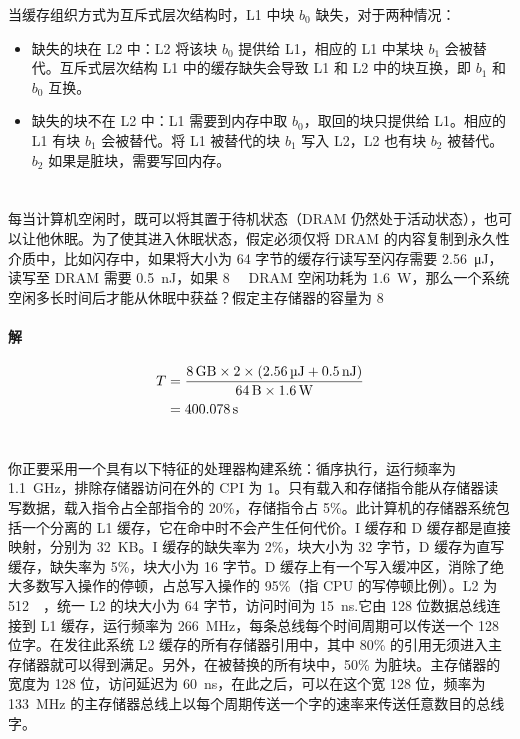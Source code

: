 \documentclass{article}
\begin{document}
当缓存组织方式为互斥式层次结构时，L1 中块 $b_0$ 缺失，对于两种情况：
\begin{itemize}
    \item 缺失的块在 L2 中：L2 将该块 $b_0$ 提供给 L1，相应的 L1 中某块 $b_1$ 会被替代。互斥式层次结构 L1 中的缓存缺失会导致 L1 和 L2 中的块互换，即 $b_1$ 和 $b_0$ 互换。
    \item 缺失的块不在 L2 中：L1 需要到内存中取 $b_0$，取回的块只提供给 L1。相应的 L1 有块 $b_1$ 会被替代。将 L1 被替代的块 $b_1$ 写入 L2，L2 也有块 $b_2$ 被替代。$b_2$ 如果是脏块，需要写回内存。
\end{itemize}
\section{}
每当计算机空闲时，既可以将其置于待机状态（DRAM 仍然处于活动状态），也可以让他休眠。为了使其进入休眠状态，假定必须仅将 DRAM 的内容复制到永久性介质中，比如闪存中，如果将大小为 64 字节的缓存行读写至闪存需要 \SI{2.56}{\micro\joule}，读写至 DRAM 需要 \SI{0.5}{\nano\joule}，如果 \SI{8}{\giga\byte} DRAM 空闲功耗为 \SI{1.6}{\watt}，那么一个系统空闲多长时间后才能从休眠中获益？假定主存储器的容量为 \SI{8}{\giga\byte}


\paragraph{解}
\begin{align*}
    T & = \frac{\SI{8}{\giga\byte} \times 2 \times (\SI{2.56}{\micro\joule} + \SI{0.5}{\nano\joule})}{\SI{64}{\byte} \times \SI{1.6}{\watt}} \\
      & = \SI{400.078}{\second}
\end{align*}


\section{}
你正要采用一个具有以下特征的处理器构建系统：循序执行，运行频率为 \SI{1.1}{\giga\hertz}，排除存储器访问在外的 CPI 为 1。只有载入和存储指令能从存储器读写数据，载入指令占全部指令的 20\%，存储指令占 5\%。此计算机的存储器系统包括一个分离的 L1 缓存，它在命中时不会产生任何代价。I 缓存和 D 缓存都是直接映射，分别为 \SI{32}{KB}。I 缓存的缺失率为 2\%，块大小为 32 字节，D 缓存为直写缓存，缺失率为 5\%，块大小为 16 字节。D 缓存上有一个写入缓冲区，消除了绝大多数写入操作的停顿，占总写入操作的 95\%（指 CPU 的写停顿比例）。L2 为 \SI{512}{\kilo\byte}，统一 L2 的块大小为 64 字节，访问时间为 \SI{15}{\nano\second}.它由 128 位数据总线连接到 L1 缓存，运行频率为 \SI{266}{\mega\hertz}，每条总线每个时间周期可以传送一个 128 位字。在发往此系统 L2 缓存的所有存储器引用中，其中 80\% 的引用无须进入主存储器就可以得到满足。另外，在被替换的所有块中，50\% 为脏块。主存储器的宽度为 128 位，访问延迟为 \SI{60}{\nano\second}，在此之后，可以在这个宽 128 位，频率为 \SI{133}{\mega\hertz} 的主存储器总线上以每个周期传送一个字的速率来传送任意数目的总线字。
\end{document}
